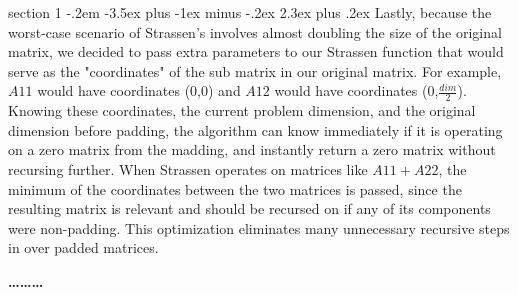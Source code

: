 \documentclass[12pt]{article}
\makeatletter
\newenvironment{problem}{\@startsection
       {section}
       {1}
       {-.2em}
       {-3.5ex plus -1ex minus -.2ex}
       {2.3ex plus .2ex}
       {\pagebreak[3]%
       \large\bf\noindent{Problem }
       }
       }
       {%
       \begin{center}\large\bf \ldots\ldots\ldots\end{center}}
\makeatother
\begin{document}
\begin{problem}{}
Lastly, because the worst-case scenario of Strassen's involves almost doubling the size of the original matrix, we decided to pass extra parameters to our Strassen function that would serve as the "coordinates" of the sub matrix in our original matrix.  For example, $A11$ would have coordinates (0,0) and $A12$ would have coordinates (0,$\frac{dim}{2}$).  Knowing these coordinates, the current problem dimension, and the original dimension before padding, the algorithm can know immediately if it is operating on a zero matrix from the madding, and instantly return a zero matrix without recursing further.  When Strassen operates on matrices like $A11+A22$, the minimum of the coordinates between the two matrices is passed, since the resulting matrix is relevant and should be recursed on if any of its components were non-padding.  This optimization eliminates many unnecessary recursive steps in over padded matrices.

\end{problem}{}
\end{document}
